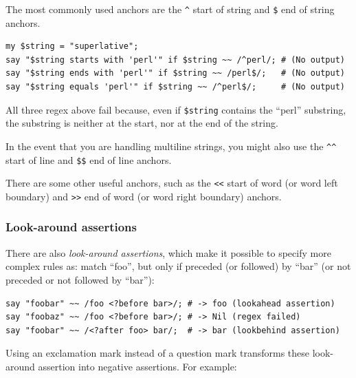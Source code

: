 
The most commonly used anchors are the \verb'^' start of 
string and \verb'$' end of string anchors.

\begin{verbatim}
my $string = "superlative";
say "$string starts with 'perl'" if $string ~~ /^perl/; # (No output)
say "$string ends with 'perl'" if $string ~~ /perl$/;   # (No output)
say "$string equals 'perl'" if $string ~~ /^perl$/;     # (No output)
\end{verbatim}

All three regex above fail because, even if 
\verb'$string' contains the ``perl'' substring, the 
substring is neither at the start, nor at the end of 
the string.

In the event that you are handling multiline strings, you might 
also use the \verb'^^' start of line and \verb'$$' end of line anchors.

There are some other useful anchors, such as the \verb'<<' 
start of word (or word left boundary) and \verb'>>' end 
of word (or word right boundary) anchors.

\subsubsection{Look-around assertions}


There are also \emph{look-around assertions}, which make it 
possible to specify more complex rules as: match ``foo'', but 
only if preceded (or followed) by ``bar'' (or not preceded or not followed by ``bar''):

\begin{verbatim}
say "foobar" ~~ /foo <?before bar>/; # -> foo (lookahead assertion)
say "foobaz" ~~ /foo <?before bar>/; # -> Nil (regex failed)
say "foobar" ~~ /<?after foo> bar/;  # -> bar (lookbehind assertion)
\end{verbatim}
%
Using an exclamation mark instead of a question mark transforms 
these look-around assertion into negative assertions. For example:

